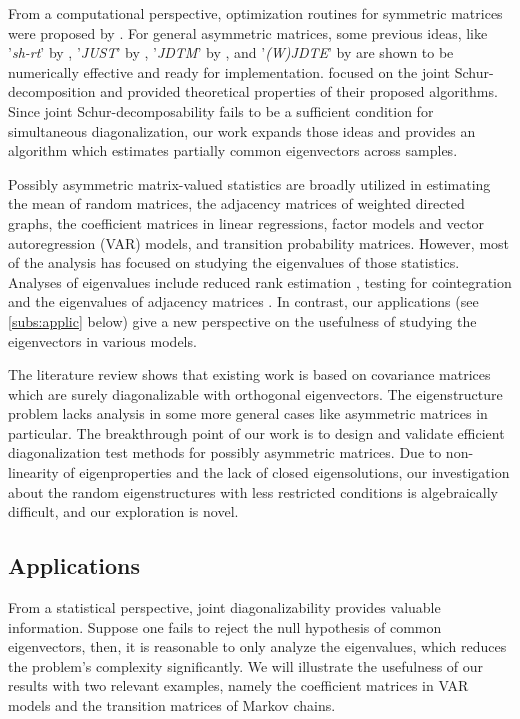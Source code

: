 \documentclass[12pt]{article}
\numberwithin{thm}{section}
\numberwithin{defn}{section}
\numberwithin{lem}{section}
\numberwithin{prop}{section}
\numberwithin{cor}{section}
\numberwithin{rem}{section}
\begin{document}
From a computational perspective, optimization routines for symmetric matrices were proposed by \cite{Fuji, Ghazi, Gira}. For general asymmetric matrices, some previous ideas, like '\textit{sh-rt}' by \cite{shrt}, '\textit{JUST}' by \cite{just}, '\textit{JDTM}' by \cite{jdtm}, and '\textit{(W)JDTE}' by \cite{andre} are shown to be numerically effective and ready for implementation. \cite{colombo, tensor} focused on the joint Schur-decomposition and provided theoretical properties of their proposed algorithms. Since joint Schur-decomposability fails to be a sufficient condition for simultaneous diagonalization, our work expands those ideas and provides an algorithm which estimates partially common eigenvectors across samples. 

Possibly asymmetric matrix-valued statistics are broadly utilized in estimating the mean of random matrices, the adjacency matrices of weighted directed graphs, the coefficient matrices in linear regressions, factor models and vector autoregression (VAR) models, and transition probability matrices. However, most of the analysis has focused on studying the eigenvalues of those statistics. Analyses of eigenvalues include reduced rank estimation \citep{robin:2000tests, Kleibergen2006:Generalized, donald:2007rank}, testing for cointegration %
\citep{Engle1987:Co,johansen91:Est,vogelsang2001unit,zhang2019identifying}
and the eigenvalues of adjacency matrices \citep{restrepo2007approximating,paul2020spectral}. In contrast, our applications (see \autoref{subs:applic} below) give a new perspective on the usefulness of studying the eigenvectors in various models.

The literature review shows that existing work is based on covariance matrices which are surely diagonalizable with orthogonal eigenvectors. 
The eigenstructure problem lacks analysis in some more general cases like asymmetric matrices in particular. The breakthrough point of our work is to design and validate efficient diagonalization test methods for possibly asymmetric matrices.
Due to non-linearity of eigenproperties and the lack of closed eigensolutions,
our investigation about the random eigenstructures with less restricted conditions is algebraically difficult, and our exploration is novel.

\vspace{-0.5cm}
\subsection{Applications} \label{subs:applic}
\vspace{-0.3cm}
From a statistical perspective, joint diagonalizability provides valuable information.
Suppose one fails to reject the null hypothesis of common eigenvectors, then, it is reasonable to only analyze the eigenvalues, which reduces the problem's complexity significantly. 
We will illustrate the usefulness of our results with two relevant examples, namely the coefficient matrices in VAR models and the transition matrices of Markov chains.
\end{document}
